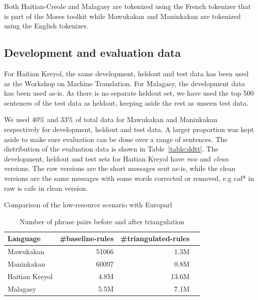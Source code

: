     Both Haitian-Creole and Malagasy are tokenized using the French tokenizer that is part of the Moses toolkit while Mawukakan and Maninkakan are tokenized using the English tokenizer.

\subsection{Development and evaluation data}
	For Haitian Kreyol, the same development, heldout and test data has been used as the Workshop on Machine Translation. For Malagasy, the development data has been used as-is. As there is no separate heldout set, we have used the top 500 sentences of the test data as heldout, keeping aside the rest as unseen test data. 

	We used 40\% and 33\% of total data for Mawukakan and Maninkakan respectively for development, heldout and test data. A larger proportion was kept aside to make sure evaluation can be done over a range of sentences. The distribution of the evaluation data is shown in Table~\ref{table:ddtt}. The development, heldout and test sets for Haitian Kreyol have \emph{raw} and \emph{clean} versions. The raw versions are the short messages sent as-is, while the clean versions are the same messages with some words corrected or removed, e.g caf* in raw is cafe in clean version. 


\begin{table}
	\small
	\centering
	
	\caption{Comparison of the low-resource scenario with Europarl}
	\label{table:datasettings}
\end{table}

\begin{table}
	\small
	\centering
	\begin{tabular}{lrrr}
	\toprule
	Language & \#baseline-rules & \#triangulated-rules \\
	\toprule
	Mawukakan & 51066 & 1.3M \\
	Maninkakan & 60097 & 0.8M \\
	Haitian Kreyol & 4.8M & 13.6M \\
	Malagasy & 5.5M & 7.1M \\
	\bottomrule
	\end{tabular}
	\caption{Number of phrase pairs before and after triangulation}
	\label{table:mul_rules}
\end{table}

